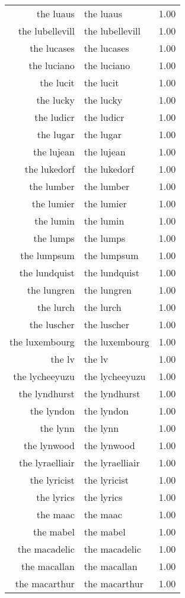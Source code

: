 \begin{table}[ht]
\begin{tabular}{rlr}
  the luaus & the luaus & 1.00 \\ 
  the lubellevill & the lubellevill & 1.00 \\ 
  the lucases & the lucases & 1.00 \\ 
  the luciano & the luciano & 1.00 \\ 
  the lucit & the lucit & 1.00 \\ 
  the lucky & the lucky & 1.00 \\ 
  the ludicr & the ludicr & 1.00 \\ 
  the lugar & the lugar & 1.00 \\ 
  the lujean & the lujean & 1.00 \\ 
  the lukedorf & the lukedorf & 1.00 \\ 
  the lumber & the lumber & 1.00 \\ 
  the lumier & the lumier & 1.00 \\ 
  the lumin & the lumin & 1.00 \\ 
  the lumps & the lumps & 1.00 \\ 
  the lumpsum & the lumpsum & 1.00 \\ 
  the lundquist & the lundquist & 1.00 \\ 
  the lungren & the lungren & 1.00 \\ 
  the lurch & the lurch & 1.00 \\ 
  the luscher & the luscher & 1.00 \\ 
  the luxembourg & the luxembourg & 1.00 \\ 
  the lv & the lv & 1.00 \\ 
  the lycheeyuzu & the lycheeyuzu & 1.00 \\ 
  the lyndhurst & the lyndhurst & 1.00 \\ 
  the lyndon & the lyndon & 1.00 \\ 
  the lynn & the lynn & 1.00 \\ 
  the lynwood & the lynwood & 1.00 \\ 
  the lyraelliair & the lyraelliair & 1.00 \\ 
  the lyricist & the lyricist & 1.00 \\ 
  the lyrics & the lyrics & 1.00 \\ 
  the maac & the maac & 1.00 \\ 
  the mabel & the mabel & 1.00 \\ 
  the macadelic & the macadelic & 1.00 \\ 
  the macallan & the macallan & 1.00 \\ 
  the macarthur & the macarthur & 1.00 \\ 

\end{tabular}
\end{table}
